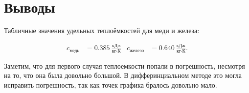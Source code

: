 \section{Выводы}

Табличные значения удельных теплоёмкостей для меди и железа:

\begin{align*}
    c_\text{медь} &= 0.385~\frac{\text{кДж}}{\text{кг}\cdot\text{К}} & c_\text{железо} &= 0.640~\frac{\text{кДж}}{\text{кг}\cdot\text{К}}.
\end{align*}

Заметим, что для первого случая теплоемкости попали в погрешность, несмотря на то, что она была довольно большой. В дифферинциальном методе это могла исправить погрешность, так как точек графика бралось довольно мало.
